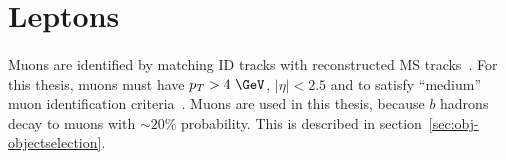 \section{Leptons}



\paragraph{}
Muons are identified by matching ID tracks with reconstructed MS tracks~\cite{Aad:2016jkr}. 
For this thesis, muons must have $p_T > 4~\GeV$, $|\eta| < 2.5$ and to satisfy ``medium'' muon identification criteria~\cite{Aad:2016jkr}. 
Muons are used in this thesis, because $b$ hadrons decay to muons with $\sim 20\%$ probability. This is described in section~\ref{sec:obj-objectselection}.

